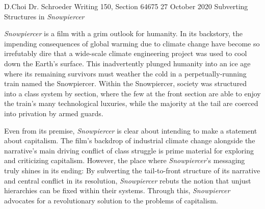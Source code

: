 \documentclass[12pt, letterpaper]{article}
\begin{document}
\begin{mla}
	{D.}{Choi}
	{Dr. Schroeder}
	{Writing 150, Section 64675}
	{27 October 2020}
	{Subverting Structures in \textit{Snowpiercer}}


\textit{Snowpiercer} is a film with a grim outlook for humanity. In its
backstory, the impending consequences of global warming due to climate change
have become so irrefutably dire that a wide-scale climate engineering project
was used to cool down the Earth's surface. This inadvertently plunged humanity
into an ice age where its remaining survivors must weather the cold in a
perpetually-running train named the Snowpiercer. Within the Snowpiercer,
society was structured into a class system by section, where the few at the
front section are able to enjoy the train's many technological luxuries, while
the majority at the tail are coerced into privation by armed guards.

Even from its premise, \textit{Snowpiercer} is clear about intending to make a
statement about capitalism. The film's backdrop of industrial climate change
alongside the narrative's main driving conflict of class struggle is prime
material for exploring and criticizing capitalism. However, the place where
\textit{Snowpiercer}'s messaging truly shines in its ending: By subverting the
tail-to-front structure of its narrative and central conflict in its
resolution, \textit{Snowpiercer} rebuts the notion that unjust hierarchies can
be fixed within their systems. Through this, \textit{Snowpiercer} advocates
for a revolutionary solution to the problems of capitalism.


\begin{workscited}
\end{workscited}


\end{mla}
\end{document}

